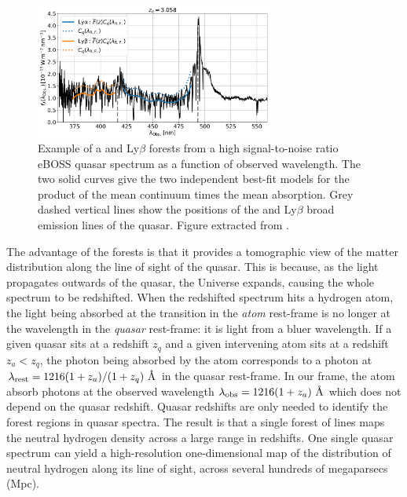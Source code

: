 \begin{figure}
    \centering
    \includegraphics[width=0.7\textwidth]{fig/forests/forest_example.png}
    \caption{Example of a \lya and Ly$\beta$ forests from a high signal-to-noise ratio 
    eBOSS quasar spectrum as a function of observed wavelength. 
    The two solid curves give the two independent best-fit models for the product of the mean continuum times the mean absorption. 
    Grey dashed vertical lines show the positions of the \lya and Ly$\beta$ broad emission lines of the quasar. 
    Figure extracted from \cite{dumasdesbourbouxhelionCompletedSDSSIVExtended2020}.}
    \label{fig:forest}
\end{figure}

The advantage of the forests is that it provides a tomographic 
view of the matter distribution along the line of sight of the quasar. 
This is because, as the light propagates outwards of the quasar, the 
Universe expands, causing the whole spectrum to be redshifted. 
When the redshifted spectrum hits a hydrogen atom, the light being
absorbed at the \lya transition in the \emph{atom} rest-frame 
is no longer at the \lya wavelength in the \emph{quasar} rest-frame:
it is light from a bluer wavelength. 
If a given quasar sits at a redshift $z_q$ and 
a given intervening atom sits at a redshift $z_a < z_q$, the \lya photon being absorbed
by the atom corresponds to a photon at $\lambda_\mathrm{rest}= 1216(1+z_a)/(1+z_q)~\angstrom$
in the quasar rest-frame. 
In our frame, the atom absorb \lya photons at the observed wavelength
$\lambda_\mathrm{obs}= 1216(1+z_a)~\angstrom$ which does not depend on the quasar redshift.
Quasar redshifts are only needed to identify the \lya forest regions in quasar spectra. 
The result is that a single forest of lines maps the neutral
hydrogen density across a large range in redshifts. 
One single quasar spectrum can yield a high-resolution one-dimensional map of 
the distribution of neutral hydrogen along its line of sight, 
across several hundreds of megaparsecs (Mpc). 

